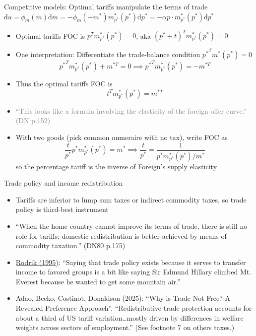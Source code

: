 \documentclass[11pt,notes=hide,aspectratio=169]{beamer}
\begin{document}
\begin{frame}{Competitive models: Optimal tariffs manipulate the terms of trade}
$\textrm{d} u = \phi_m(m) \textrm{d} m = - \phi_m(-m^*) m^{*}_{p^*}(p^*)\textrm{d} p^* = - \alpha p \cdot m^{*}_{p^*}(p^*)\textrm{d} p^*$
\begin{itemize}
\item Optimal tariffs FOC is $p^T m^{*}_{p^*}(p^*) =0$, aka $(p^* + t)^T m^{*}_{p^*}(p^*) =0$
\item One interpretation: Differentiate the trade-balance condition ${p^*}^{T} m^*(p^*) = 0$
$${p^*}^{T} m_{p^*}^*(p^*) + m^{*T} = 0 \implies {p^*}^{T} m_{p^*}^*(p^*) = - m^{*T}$$
\item Thus the optimal tariffs FOC is
$$t^{T} m_{p^*}^*(p^*) = m^{*T}$$
\item[] \textcolor{gray}{\scriptsize ``This looks like a formula involving the elasticity of the foreign offer curve.'' (DN p.152)}
\item With two goods (pick common numeraire with no tax), write FOC as  
$$
\frac{t}{p^*} p^* m^*_{p^*}(p^*) = m^*
\implies
\frac{t}{p^*} = \frac{1}{p^* m^*_{p^*}(p^*) / m^*}
$$
so the percentage tariff is the inverse of Foreign's supply elasticity
\end{itemize}
\end{frame}
\begin{frame}{Trade policy and income redistribution}
\begin{itemize}
\item Tariffs are inferior to lump sum taxes or indirect commodity taxes, so trade policy is third-best instrument
\item ``When the home country cannot improve its terms of trade, there is still no role for tariffs; domestic redistribution is better achieved by means of commodity taxation.'' (DN80 p.175)
\item \href{http://www.sciencedirect.com.proxy.uchicago.edu/science/article/pii/S1573440405800085}{Rodrik (1995)}: ``Saying that trade policy exists because it serves to transfer income to favored groups is a bit like saying Sir Edmund Hillary climbed Mt. Everest because he wanted to get some mountain air.''
\item Adao, Becko, Costinot, Donaldson (2025): ``Why is Trade Not Free? A Revealed Preference Approach''. ``Redistributive trade protection accounts for about a third of US tariff variation\dots mostly driven by differences in welfare weights across sectors of employment.'' (See footnote 7 on others taxes.)
\end{itemize}
\end{frame}
\end{document}
